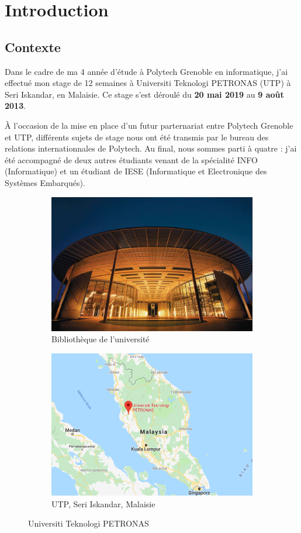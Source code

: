 \chapter{Introduction}

\section{Contexte}

Dans le cadre de ma 4 année d'étude à Polytech Grenoble en informatique, j'ai effectué mon stage de 12 semaines à Universiti Teknologi PETRONAS (UTP) à Seri Iskandar, en Malaisie. Ce stage s'est déroulé du \textbf{20 mai 2019} au \textbf{9 août 2013}.

À l'occasion de la mise en place d'un futur parternariat entre Polytech Grenoble et UTP, différents sujets de stage nous ont été transmis par le bureau des relations internationnales de Polytech. Au final, nous sommes parti à quatre : j'ai été accompagné de deux autres étudiants venant de la spécialité INFO (Informatique) et un étudiant de IESE (Informatique et Electronique des Systèmes Embarqués).


\begin{figure}[h]
  \centering
  \begin{subfigure}{.5\textwidth}
    \centering
    \includegraphics[width=.8\linewidth]{content/imgs/utp.jpg}
    \caption{Bibliothèque de l'université}
  \end{subfigure}%
  \begin{subfigure}{.5\textwidth}
    \centering
    \includegraphics[width=.8\linewidth]{content/imgs/map.png}
    \caption{UTP, Seri Iskandar, Malaisie}
  \end{subfigure}
  \caption{Universiti Teknologi PETRONAS}
\end{figure}




